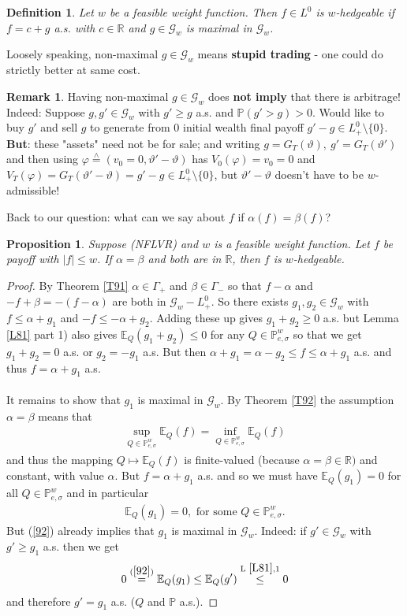 \documentclass[12pt,a4paper, twoside]{article}
\newtheorem{prop}{Proposition}[section]
\newtheorem{defn}{Definition}[section]
\theoremstyle{definition}
\newtheorem{rem}{Remark}[section]
\newcommand{\EE}{\mathbb{E}} %
\newcommand{\PP}{\mathbb{P}} %
\newcommand{\teq}{\overset{\wedge}{=}}
\begin{document}
\begin{defn} Let $w$ be a feasible weight function. Then $f \in L^0$ is $w$-hedgeable if $f=c+g$ a.s. with $c \in \mathbb{R}$ and $g \in \mathcal{G}_w$ is maximal in $\mathcal{G}_w$. 
\end{defn}
Loosely speaking, non-maximal $g \in \mathcal{G}_w$ means \textbf{stupid trading} - one could do strictly better at same cost. 
\begin{rem}Having non-maximal $g \in \mathcal{G}_w$ does \textbf{not imply} that there is arbitrage! Indeed: Suppose $g,g' \in \mathcal{G}_w$ with $g' \geq g$ a.s. and $\PP(g'>g)>0$. Would like to buy $g'$ and sell $g$ to generate from $0$ initial wealth final payoff $g'-g \in L_+^0 \setminus \{0\}$. \textbf{But}: these "assets" need not be for sale; and writing $g= G_T( \vartheta), \ g' = G_T( \vartheta')$ and then using $\varphi \teq (v_0=0, \vartheta'-\vartheta)$ has $V_0( \varphi)=v_0=0$ and $V_T( \varphi)  = G_T( \vartheta'-\vartheta) = g'-g \in L_+^0 \setminus \{0\}$, but $\vartheta'-\vartheta$ doesn't have to be $w$-admissible!
\end{rem}
Back to our question: what can we say about $f$ if $\alpha(f)= \beta(f)$?
\begin{prop} \label{P94} Suppose (NFLVR) and $w$ is a feasible weight function. Let $f$ be payoff with $|f| \leq w$. If $\alpha= \beta$ and both are in $\mathbb{R}$, then $f$ is $w$-hedgeable. 
\end{prop}
\begin{proof}
By Theorem \ref{T91} $\alpha \in \Gamma_+$ and $\beta \in \Gamma_-$ so that $f- \alpha$ and $-f+ \beta = -(f- \alpha)$ are both in $\mathcal{G}_w-L_+^0$. So there exists $g_1,g_2 \in \mathcal{G}_w$ with $f \leq \alpha + g_1$ and $-f \leq -\alpha + g_2$. Adding these up gives $g_1 + g_2 \geq 0$ a.s. but Lemma \ref{L81} part 1) also gives $\EE_Q(g_1+g_2) \leq 0$ for any $Q \in \PP_{e, \sigma}^w$ so that we get $g_1 + g_2=0$ a.s. or $g_2=-g_1$ a.s. But then $\alpha + g_1= \alpha -g_2 \leq f \leq \alpha + g_1$ a.s. and thus $f= \alpha + g_1$ a.s. 
\\\\
It remains to show that $g_1$ is maximal in $\mathcal{G}_w$. By Theorem \ref{T92} the assumption $\alpha = \beta$ means that 
\begin{align*}
\sup_{Q \in \PP_{e, \sigma}^w } \EE_Q(f) = \inf_{Q \in \PP_{e, \sigma}^w } \EE_Q(f)
\end{align*}
and thus the mapping $Q \mapsto \EE_Q(f)$ is finite-valued (because $\alpha= \beta \in \mathbb{R})$ and constant, with value $\alpha$. But $f= \alpha + g_1$ a.s. and so we must have $\EE_Q(g_1)=0$ for all $Q \in \PP_{e, \sigma}^w$ and in particular 
\begin{align*} \label{92}
\EE_Q(g_1)=0, \text{ for some } Q \in \PP_{e, \sigma}^w. \tag{10.2}
\end{align*}
But (\ref{92}) already implies that $g_1$ is maximal in $\mathcal{G}_w$. Indeed: if $g' \in \mathcal{G}_w$ with $g' \geq g_1$ a.s. then we get 
\begin{align*}
0 \overset{(\ref{92})}= \EE_Q(g_1) \leq \EE_Q(g') \overset{\text{L } \ref{L81},1}\leq 0  
\end{align*}
and therefore $g'=g_1$ a.s. ($Q$ and $\PP$ a.s.). 
\end{proof}
\end{document}
